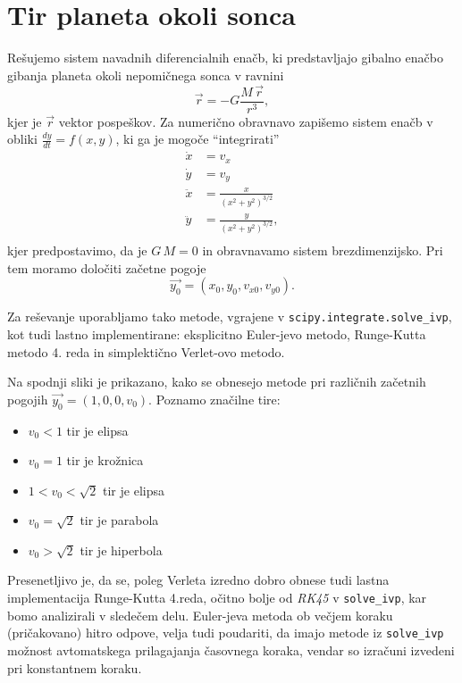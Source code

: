 \section{Tir planeta okoli sonca}

Rešujemo sistem navadnih diferencialnih enačb, ki predstavljajo gibalno enačbo gibanja planeta okoli nepomičnega sonca v ravnini
\begin{equation}
    \vec{r} = -G \frac{M\,\vec{r}}{r^3},
\end{equation}
kjer je $\vec{r}$ vektor pospeškov. Za numerično obravnavo zapišemo sistem enačb v obliki $\frac{dy}{dt} = f(x,y)$, ki ga je mogoče ``integrirati''
\begin{align}
    \dot{x} &= v_x \\ \nonumber
    \dot{y} &= v_y \\ \nonumber
    \ddot{x} &= \frac{x}{(x^2+y^2)^{3/2}} \\ \nonumber
    \ddot{y} &= \frac{y}{(x^2+y^2)^{3/2}}, \\ \nonumber
\end{align}
kjer predpostavimo, da je $G\,M=0$ in obravnavamo sistem brezdimenzijsko. Pri tem moramo določiti začetne pogoje
\begin{equation}
    \vec{y_0} = (x_0, y_0, v_{x0},v_{y0}).
\end{equation}

Za reševanje uporabljamo tako metode, vgrajene v \texttt{scipy.integrate.solve\_ivp}, kot tudi lastno implementirane: eksplicitno Euler-jevo metodo, Runge-Kutta metodo 4. reda in simplektično Verlet-ovo metodo.

Na spodnji sliki je prikazano, kako se obnesejo metode pri različnih začetnih pogojih $\vec{y_0}=(1,0,0,v_{0})$. Poznamo značilne tire:
\begin{itemize}
    \item $v_0<1$ tir je elipsa
    \item $v_0=1$ tir je krožnica
    \item $1<v_0<\sqrt{2}$ tir je elipsa
    \item $v_0=\sqrt{2}$ tir je parabola
    \item $v_0>\sqrt{2}$ tir je hiperbola
\end{itemize}
Presenetljivo je, da se, poleg Verleta izredno dobro obnese tudi lastna implementacija Runge-Kutta 4.reda, očitno bolje od \textit{RK45} v \texttt{solve\_ivp}, kar bomo analizirali v sledečem delu. Euler-jeva metoda ob večjem koraku (pričakovano) hitro odpove, velja tudi poudariti, da imajo metode iz \texttt{solve\_ivp} možnost avtomatskega prilagajanja časovnega koraka, vendar so izračuni izvedeni pri konstantnem koraku.

